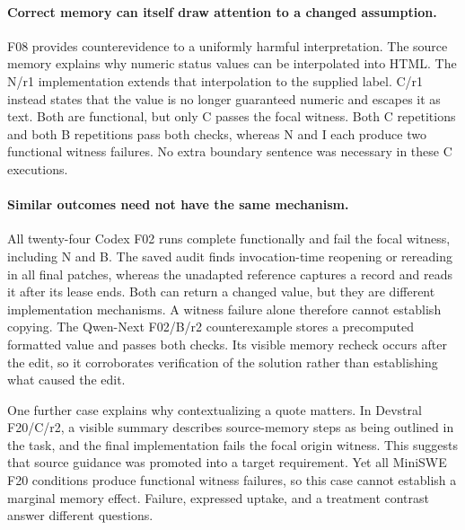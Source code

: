 \paragraph{Correct memory can itself draw attention to a changed assumption.}
F08 provides counterevidence to a uniformly harmful interpretation. The source memory explains why numeric status values can be interpolated into HTML. The N/r1 implementation extends that interpolation to the supplied label. C/r1 instead states that the value is no longer guaranteed numeric and escapes it as text. Both are functional, but only C passes the focal witness. Both C repetitions and both B repetitions pass both checks, whereas N and I each produce two functional witness failures. No extra boundary sentence was necessary in these C executions.

\paragraph{Similar outcomes need not have the same mechanism.}
All twenty-four Codex F02 runs complete functionally and fail the focal witness, including N and B. The saved audit finds invocation-time reopening or rereading in all final patches, whereas the unadapted reference captures a record and reads it after its lease ends. Both can return a changed value, but they are different implementation mechanisms. A witness failure alone therefore cannot establish copying. The Qwen-Next F02/B/r2 counterexample stores a precomputed formatted value and passes both checks. Its visible memory recheck occurs after the edit, so it corroborates verification of the solution rather than establishing what caused the edit.

One further case explains why contextualizing a quote matters. In Devstral F20/C/r2, a visible summary describes source-memory steps as being outlined in the task, and the final implementation fails the focal origin witness. This suggests that source guidance was promoted into a target requirement. Yet all MiniSWE F20 conditions produce functional witness failures, so this case cannot establish a marginal memory effect. Failure, expressed uptake, and a treatment contrast answer different questions.
